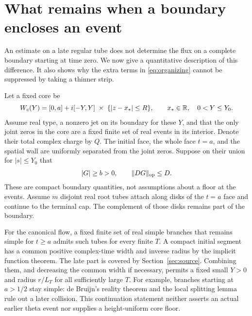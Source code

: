 \section{What remains when a boundary encloses an event}
\label{sec:eventclosure}

An estimate on a late regular tube does not determine the flux on a
complete boundary starting at time zero. We now give a quantitative
description of this difference. It also shows why the extra terms in
\eqref{eq:organizing} cannot be suppressed by taking a thinner strip.

Let a fixed core be
\[
 W_c(Y)=[0,a]+i[-Y,Y]\;\times\;\{|z-x_*|\le R\},
 \qquad x_*\in\mathbb R,\quad 0<Y\le Y_0.
\]
Assume real type, a nonzero jet on its boundary for these $Y$, and
that the only joint zeros in the core are a fixed finite set of real
events in its interior. Denote their total complex charge by $Q$.
The initial face, the whole face $t=a$, and the spatial wall are
uniformly separated from the joint zeros. Suppose on their union
for $|s|\le Y_0$ that
\begin{equation}
 |G|\ge b>0,\qquad \|DG\|_{\rm op}\le D.
 \label{eq:corefloor}
\end{equation}
These are compact boundary quantities, not assumptions about a floor
at the events. Assume $m$ disjoint real root tubes attach along disks
of the $t=a$ face and continue to the terminal cap. The complement
of those disks remains part of the boundary.

For the canonical flow, a fixed finite set of real simple branches
that remains simple for $t\ge a$ admits such tubes for every finite
$T$. A compact initial segment has a common positive complex-time
width and inverse radius by the implicit function theorem. The
late part is covered by Section~\ref{sec:source}. Combining them,
and decreasing the common width if necessary, permits a fixed small
$Y>0$ and radius $r/L_T$ for all sufficiently large $T$. For
example, branches starting at $a>1/2$ stay simple: de Bruijn's
reality theorem and the local splitting lemma rule out a later
collision. This continuation statement neither asserts an actual
earlier theta event nor supplies a height-uniform core floor.

